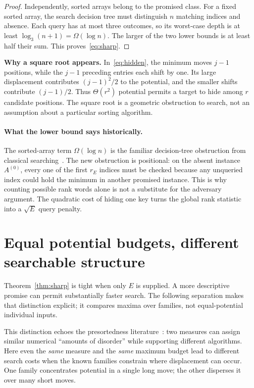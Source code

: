 \documentclass[10pt,letterpaper]{article}
\begin{document}
\begin{proof}
Independently, sorted arrays belong to the promised class. For a fixed sorted array,
the search decision tree must distinguish $n$ matching indices and absence. Each query
has at most three outcomes, so its worst-case depth is at least
$\log_3(n+1)=\Omega(\log n)$. The larger of the two lower bounds is at least half
their sum. This proves~\eqref{eq:sharp}.
\end{proof}

\textbf{Why a square root appears.} In~\eqref{eq:hidden}, the minimum moves $j-1$ positions,
while the $j-1$ preceding entries each shift by one. Its large displacement contributes
$(j-1)^2/2$ to the potential, and the smaller shifts contribute $(j-1)/2$.
Thus $\Theta(r^2)$ potential permits a target to hide among $r$ candidate positions.
The square root is a geometric obstruction to search, not an assumption about a
particular sorting algorithm.

\paragraph{What the lower bound says historically.}
The sorted-array term $\Omega(\log n)$ is the familiar decision-tree obstruction
from classical searching~\cite{knuth}. The new obstruction is positional: on
the absent instance $A^{(0)}$, every one of the first $r_E$ indices must be
checked because any unqueried index could hold the minimum in another
promised instance. This is why counting possible rank words alone is not a
substitute for the adversary argument. The quadratic cost of hiding one key
turns the global rank statistic into a $\sqrt E$ query penalty.

\newpage
\section{Equal potential budgets, different searchable structure}
Theorem~\ref{thm:sharp} is tight when only $E$ is supplied. A more descriptive promise
can permit substantially faster search. The following separation makes that distinction
explicit; it compares maxima over families, not equal-potential individual inputs.

This distinction echoes the presortedness literature~\cite{mannila,diaconis}:
two measures can assign similar numerical ``amounts of disorder'' while
supporting different algorithms. Here even the \emph{same} measure and the
\emph{same} maximum budget lead to different search costs when the known
families constrain where displacement can occur. One family concentrates
potential in a single long move; the other disperses it over many short moves.
\end{document}
